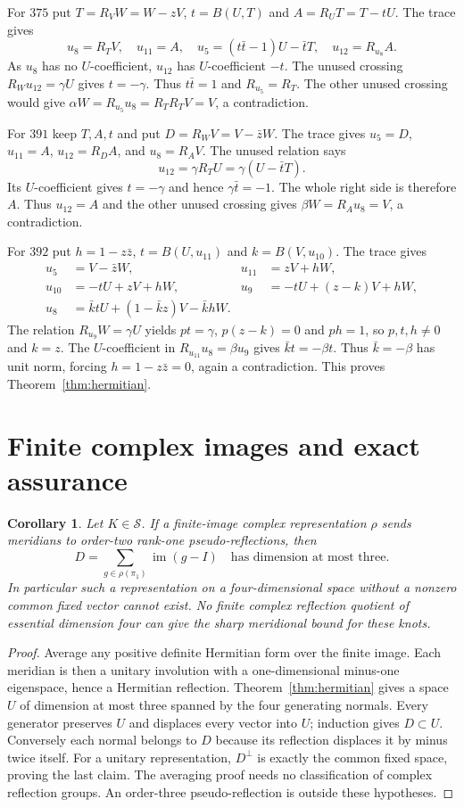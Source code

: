 \documentclass[11pt]{article}
\newtheorem{corollary}[theorem]{Corollary}
\begin{document}
For $375$ put $T=R_VW=W-zV$, $t=B(U,T)$ and
$A=R_UT=T-tU$. The trace gives
\[
 u_8=R_TV,\quad u_{11}=A,\quad
 u_5=(t\bar t-1)U-\bar tT,\quad u_{12}=R_{u_8}A.
\]
As $u_8$ has no $U$-coefficient, $u_{12}$ has $U$-coefficient $-t$.
The unused crossing $R_Wu_{12}=\gamma U$ gives $t=-\gamma$.
Thus $t\bar t=1$ and $R_{u_5}=R_T$.
The other unused crossing would give
$\alpha W=R_{u_5}u_8=R_TR_TV=V$, a contradiction.

For $391$ keep $T,A,t$ and put $D=R_WV=V-\bar zW$.
The trace gives $u_5=D$, $u_{11}=A$, $u_{12}=R_DA$, and
$u_8=R_AV$. The unused relation says
\[
 u_{12}=\gamma R_TU=\gamma(U-\bar tT).
\]
Its $U$-coefficient gives $t=-\gamma$ and hence
$\gamma\bar t=-1$. The whole right side is therefore $A$.
Thus $u_{12}=A$ and the other unused crossing gives
$\beta W=R_Au_8=V$, a contradiction.

For $392$ put $h=1-z\bar z$, $t=B(U,u_{11})$ and
$k=B(V,u_{10})$. The trace gives
\[
\begin{aligned}
u_5&=V-\bar zW,&u_{11}&=zV+hW,\\
u_{10}&=-tU+zV+hW,&u_9&=-tU+(z-k)V+hW,\\
u_8&=\bar k tU+(1-\bar k z)V-\bar k hW.
\end{aligned}
\]
The relation $R_{u_9}W=\gamma U$ yields
$pt=\gamma$, $p(z-k)=0$ and $ph=1$, so $p,t,h\ne0$ and $k=z$.
The $U$-coefficient in $R_{u_{11}}u_8=\beta u_9$ gives
$\bar k t=-\beta t$. Thus $\bar k=-\beta$ has unit norm,
forcing $h=1-z\bar z=0$, again a contradiction.
This proves Theorem~\ref{thm:hermitian}.

\section{Finite complex images and exact assurance}

\begin{corollary}\label{cor:finite}
Let $K\in\mathcal S$. If a finite-image complex representation
$\rho$ sends meridians to order-two rank-one pseudo-reflections,
then
\[
 D=\sum_{g\in\rho(\pi_1)}\operatorname{im}(g-I)
 \quad\text{has dimension at most three}.
\]
In particular such a representation on a four-dimensional space
without a nonzero common fixed vector cannot exist. No finite
complex reflection quotient of essential dimension four can give
the sharp meridional bound for these knots.
\end{corollary}
\begin{proof}
Average any positive definite Hermitian form over the finite image.
Each meridian is then a unitary involution with a one-dimensional
minus-one eigenspace, hence a Hermitian reflection. Theorem~\ref{thm:hermitian}
gives a space $U$ of dimension at most three spanned by the four
generating normals. Every generator preserves $U$ and displaces
every vector into $U$; induction gives $D\subset U$.
Conversely each normal belongs to $D$ because its reflection
displaces it by minus twice itself. For a unitary representation,
$D^\perp$ is exactly the common fixed space, proving the last claim.
The averaging proof needs no classification of complex reflection
groups. An order-three pseudo-reflection is outside these hypotheses.
\end{proof}
\end{document}

